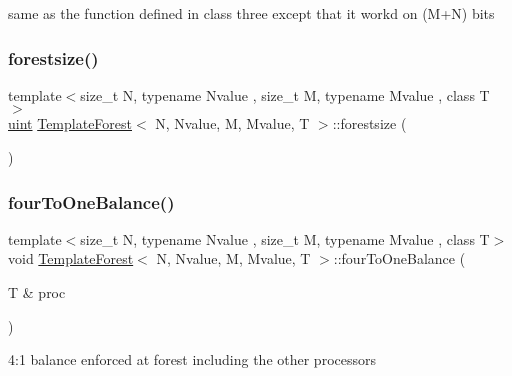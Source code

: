 same as the function defined in class three except that it workd on (M+N) bits \mbox{\label{classTemplateForest_a832fb663d114e9fc75ac8bc965a77d66}} 
\subsubsection{\texorpdfstring{forestsize()}{forestsize()}}
{\footnotesize\ttfamily template$<$size\+\_\+t N, typename Nvalue , size\+\_\+t M, typename Mvalue , class T $>$ \\
\mbox{\hyperlink{definitions_8h_a69aa29b598b851b0640aa225a9e5d61d}{uint}} \mbox{\hyperlink{classTemplateForest}{Template\+Forest}}$<$ N, Nvalue, M, Mvalue, T $>$\+::forestsize (\begin{DoxyParamCaption}{ }\end{DoxyParamCaption})}

\mbox{\label{classTemplateForest_abba9b72e8699f78570c73bec1b4396d1}} 
\subsubsection{\texorpdfstring{four\+To\+One\+Balance()}{fourToOneBalance()}}
{\footnotesize\ttfamily template$<$size\+\_\+t N, typename Nvalue , size\+\_\+t M, typename Mvalue , class T$>$ \\
void \mbox{\hyperlink{classTemplateForest}{Template\+Forest}}$<$ N, Nvalue, M, Mvalue, T $>$\+::four\+To\+One\+Balance (\begin{DoxyParamCaption}\item[{T \&}]{proc }\end{DoxyParamCaption})}

4\+:1 balance enforced at forest including the other processors \mbox{\label{classTemplateForest_abcdbb8b1c48c6e94ad86df60e80f36b3}} 
